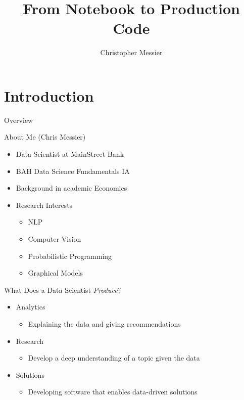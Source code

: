 \documentclass[12pt,t]{beamer}
\title[FNTPC]{From Notebook to Production Code}
\author[Messier]{Christopher Messier}
\institute[DSI-DC]{General Assembly\\Washington, DC}
\begin{document}
\linespread{1.5}

\begin{frame}
	\titlepage
\end{frame}


\section{Introduction}

\begin{frame}{Overview}
	\tableofcontents
\end{frame}

\begin{frame}{About Me (Chris Messier)}
	\begin{itemize}
		\item Data Scientist at MainStreet Bank
		\item BAH Data Science Fundamentals IA
		\item Background in academic Economics
		\item Research Interests
		\begin{itemize}
			\item NLP
			\item Computer Vision
			\item Probabilistic Programming
			\item Graphical Models
		\end{itemize}
	\end{itemize}
\end{frame}

\begin{frame}{What Does a Data Scientist \emph{Produce}?}
	\begin{itemize}
		\item Analytics
		\begin{itemize}
			\item Explaining the data and giving recommendations
		\end{itemize}
		\pause
		\item Research
		\begin{itemize}
			\item Develop a deep understanding of a topic given the data
		\end{itemize}
		\pause
		\item Solutions
		\begin{itemize}
			\item Developing software that enables data-driven solutions
		\end{itemize}
	\end{itemize}
\end{frame}
\end{document}
